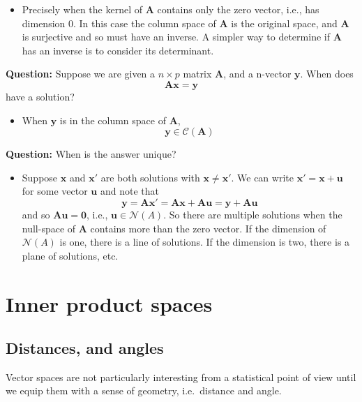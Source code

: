 \documentclass[]{book}
\providecommand{\tightlist}{%
  \setlength{\itemsep}{0pt}\setlength{\parskip}{0pt}}
\theoremstyle{definition}
\theoremstyle{definition}
\theoremstyle{definition}
\theoremstyle{remark}
\begin{document}
\begin{itemize}
\tightlist
\item
  Precisely when the kernel of \(\mathbf A\) contains only the zero vector, i.e., has dimension 0. In this case the column space of \(\mathbf A\) is the original space, and \(\mathbf A\) is surjective and so must have an inverse. A simpler way to determine if \(\mathbf A\) has an inverse is to consider its determinant.
\end{itemize}

\textbf{Question:} Suppose we are given a \(n\times p\) matrix \(\mathbf A\), and a n-vector \(\mathbf y\). When does
\[\mathbf A\mathbf x= \mathbf y\]
have a solution?

\begin{itemize}
\tightlist
\item
  When \(\mathbf y\) is in the column space of \(\mathbf A\),
  \[\mathbf y\in \mathcal{C}(\mathbf A)\]
\end{itemize}

\textbf{Question:} When is the answer unique?

\begin{itemize}
\tightlist
\item
  Suppose \(\mathbf x\) and \(\mathbf x'\) are both solutions with \(\mathbf x\not =\mathbf x'\). We can write \(\mathbf x'=\mathbf x+\mathbf u\) for some vector \(\mathbf u\) and note that
  \[\mathbf y=\mathbf A\mathbf x' = \mathbf A\mathbf x+\mathbf A\mathbf u= \mathbf y+\mathbf A\mathbf u\]
  and so \(\mathbf A\mathbf u=\boldsymbol 0\), i.e., \(\mathbf u\in \mathcal{N}(A)\). So there are multiple solutions when the null-space of \(\mathbf A\) contains more than the zero vector. If the dimension of \(\mathcal{N}(A)\) is one, there is a line of solutions. If the dimension is two, there is a plane of solutions, etc.
\end{itemize}

\hypertarget{linalg-innerprod}{%
\section{Inner product spaces}\label{linalg-innerprod}}

\hypertarget{normed}{%
\subsection{Distances, and angles}\label{normed}}

Vector spaces are not particularly interesting from a statistical point of view until we equip them with a sense of geometry, i.e.~distance and angle.
\end{document}
